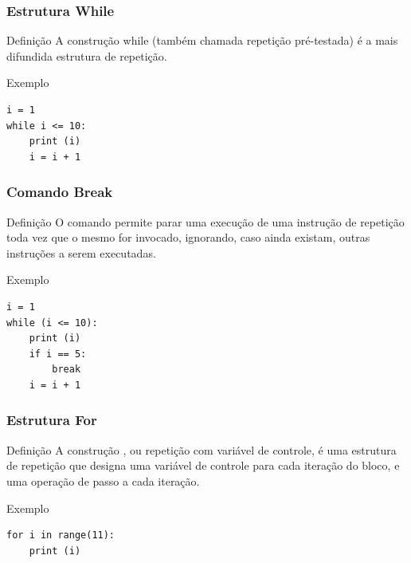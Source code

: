 \documentclass{beamer}
\begin{document}
\begin{frame}[fragile]
\frametitle{Estrutura While}

\begin{block}{Definição}
A construção while (também chamada repetição pré-testada) é a mais difundida estrutura de repetição.
\end{block}\vfill

\begin{exampleblock}{Exemplo}
\begin{lstlisting}
i = 1
while i <= 10:
    print (i)
    i = i + 1
\end{lstlisting}
\end{exampleblock}
\end{frame}

\begin{frame}[fragile]
\frametitle{Comando Break}

\begin{block}{Definição}
O comando  permite parar uma execução de uma instrução de repetição toda vez que o mesmo for invocado, ignorando, caso ainda existam, outras instruções a serem executadas.
\end{block}\vfill

\begin{exampleblock}{Exemplo}
	\begin{lstlisting}
i = 1
while (i <= 10):
    print (i)
    if i == 5: 
        break
    i = i + 1
	\end{lstlisting}
\end{exampleblock}
\end{frame}

\begin{frame}[fragile]
\frametitle{Estrutura For}

\begin{block}{Definição}
A construção , ou repetição com variável de controle, é uma estrutura de repetição que designa uma variável de controle para cada iteração do bloco, e uma operação de passo a cada iteração.
\end{block}\vfill

\begin{exampleblock}{Exemplo}
	\begin{lstlisting}
for i in range(11):
    print (i)
	\end{lstlisting}
\end{exampleblock}
\end{frame}
\end{document}
